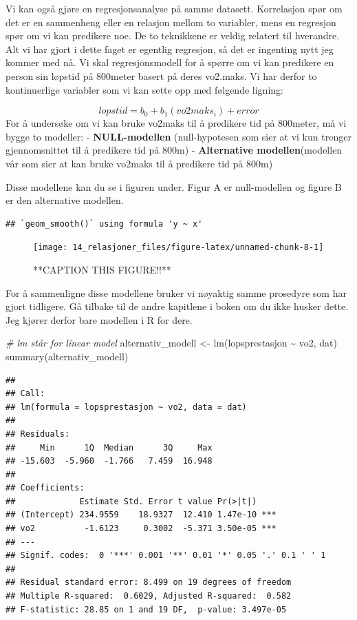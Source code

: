 \documentclass[
]{book}
\newenvironment{Shaded}{\begin{snugshade}}{\end{snugshade}}
\newcommand{\CommentTok}[1]{\textcolor[rgb]{0.56,0.35,0.01}{\textit{#1}}}
\newcommand{\FunctionTok}[1]{\textcolor[rgb]{0.00,0.00,0.00}{#1}}
\newcommand{\NormalTok}[1]{#1}
\newcommand{\OtherTok}[1]{\textcolor[rgb]{0.56,0.35,0.01}{#1}}
\newcommand{\SpecialCharTok}[1]{\textcolor[rgb]{0.00,0.00,0.00}{#1}}
\begin{document}
Vi kan også gjøre en regresjonsanalyse på samme datasett. Korrelasjon spør om det er en sammenheng eller en relasjon mellom to variabler, mens en regresjon spør om vi kan predikere noe. De to teknikkene er veldig relatert til hverandre. Alt vi har gjort i dette faget er egentlig regresjon, så det er ingenting nytt jeg kommer med nå. Vi skal regresjonsmodell for å spørre om vi kan predikere en person sin løpstid på 800meter basert på deres vo2.maks. Vi har derfor to kontinuerlige variabler som vi kan sette opp med følgende ligning:

\[
lopstid= b_0 + b_1(vo2maks_i) + error 
\]
For å undersøke om vi kan bruke vo2maks til å predikere tid på 800meter, må vi bygge to modeller:
- \textbf{NULL-modellen} (null-hypotesen som sier at vi kun trenger gjennomsnittet til å predikere tid på 800m)
- \textbf{Alternative modellen}(modellen vår som sier at kan bruke vo2maks til å predikere tid på 800m)

Disse modellene kan du se i figuren under. Figur A er null-modellen og figure B er den alternative modellen.

\begin{verbatim}
## `geom_smooth()` using formula 'y ~ x'
\end{verbatim}

\begin{figure}

{\centering \texttt{[image: 14\_relasjoner\_files/figure-latex/unnamed-chunk-8-1]} 

}

\caption{**CAPTION THIS FIGURE!!**}\label{fig:unnamed-chunk-8}
\end{figure}

For å sammenligne disse modellene bruker vi nøyaktig samme prosedyre som har gjort tidligere. Gå tilbake til de andre kapitlene i boken om du ikke husker dette. Jeg kjører derfor bare modellen i R for dere.

\begin{Shaded}
\begin{Highlighting}[]
\CommentTok{\# lm står for linear model}
\NormalTok{alternativ\_modell }\OtherTok{\textless{}{-}} \FunctionTok{lm}\NormalTok{(lopsprestasjon }\SpecialCharTok{\textasciitilde{}}\NormalTok{ vo2, dat)}
\FunctionTok{summary}\NormalTok{(alternativ\_modell)}
\end{Highlighting}
\end{Shaded}

\begin{verbatim}
## 
## Call:
## lm(formula = lopsprestasjon ~ vo2, data = dat)
## 
## Residuals:
##     Min      1Q  Median      3Q     Max 
## -15.603  -5.960  -1.766   7.459  16.948 
## 
## Coefficients:
##             Estimate Std. Error t value Pr(>|t|)    
## (Intercept) 234.9559    18.9327  12.410 1.47e-10 ***
## vo2          -1.6123     0.3002  -5.371 3.50e-05 ***
## ---
## Signif. codes:  0 '***' 0.001 '**' 0.01 '*' 0.05 '.' 0.1 ' ' 1
## 
## Residual standard error: 8.499 on 19 degrees of freedom
## Multiple R-squared:  0.6029, Adjusted R-squared:  0.582 
## F-statistic: 28.85 on 1 and 19 DF,  p-value: 3.497e-05
\end{verbatim}
\end{document}
